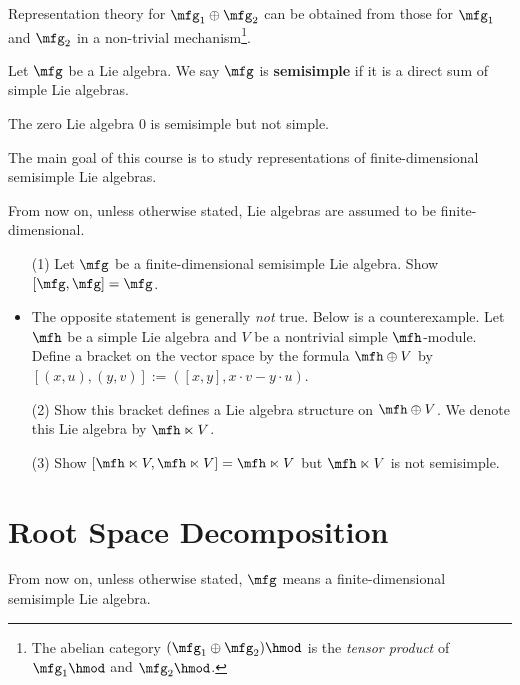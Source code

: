 \begin{rem}
	Representation theory for $\mfg_1\oplus \mfg_2$ can be obtained from those for $\mfg_1$ and $\mfg_2$ in a non-trivial mechanism\footnote{The abelian category $(\mfg_1\oplus \mfg_2)\hmod$ is the \emph{tensor product} of $\mfg_1\hmod$ and $\mfg_2\hmod$.}.
\end{rem}

\begin{defn}
	Let $\mfg$ be a Lie algebra. We say $\mfg$ is \textbf{semisimple} if it is a direct sum of simple Lie algebras.
\end{defn}

\begin{rem}
	The zero Lie algebra $0$ is semisimple but not simple.
\end{rem}

The main goal of this course is to study representations of finite-dimensional semisimple Lie algebras.

\begin{convn}
	From now on, unless otherwise stated, Lie algebras are assumed to be finite-dimensional.
\end{convn}

\begin{exe}
	\begin{itemize}
		\item[(1)]
			Let $\mfg$ be a finite-dimensional semisimple Lie algebra. Show $[\mfg,\mfg]=\mfg$.
		\item
			The opposite statement is generally \emph{not} true. Below is a counterexample. Let $\mfh$ be a simple Lie algebra and $V$ be a nontrivial simple $\mfh$-module. Define a bracket on the vector space by the formula $\mfh\oplus V$ by $[(x,u),(y,v)]:=([x,y],x\cdot v-y\cdot u)$.
		\item[(2)]
			Show this bracket defines a Lie algebra structure on $\mfh\oplus V$. We denote this Lie algebra by $\mfh\ltimes V$.
		\item[(3)]
			Show $[\mfh\ltimes V, \mfh\ltimes V]=\mfh\ltimes V$ but $\mfh\ltimes V$ is not semisimple.
	\end{itemize}
\end{exe}

\section{Root Space Decomposition}



\begin{convn}
	From now on, unless otherwise stated, $\mfg$ means a finite-dimensional semisimple Lie algebra.
\end{convn}

